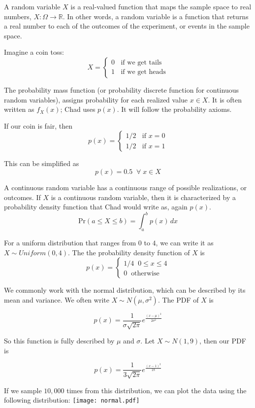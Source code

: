 \documentclass{article} %
\newcommand*\red{\color{red}}  %
\begin{document}
A {\red random variable} $X$ is a real-valued function that maps the sample space to real numbers, $X : \Omega \rightarrow \mathbb{R}$. In other words, a random variable is a function that returns a real number to each of the outcomes of the experiment, or events in the sample space.

Imagine a coin toss:
\[
X = \begin{cases}
	0 \;\; \text{ if we get tails} \\
	1 \;\; \text{ if we get heads}
\end{cases}
\]

The {\red probability mass function} (or probability discrete function for continuous random variables), assigns probability for each realized value $x \in X$. It is often written as $f_X(x)$; Chad uses $p(x)$. It will follow the probability axioms.

If our coin is fair, then
\[
p(x) = \begin{cases}
1/2 \;\; \text{ if } x = 0 \\
1/2 \;\; \text{ if } x = 1
\end{cases}
\]

This can be simplified as 
\[
p(x) = 0.5 \;\; \forall \; x \in X
\]

A {\red continuous random variable} has a continuous range of possible realizations, or outcomes. If $X$ is a continuous random variable, then it is characterized by a {\red probability density function} that Chad would write as, again $p(x)$.
\[
\text{Pr}(a \leq X \leq b) =  \int_a^b p(x) \, dx
\] 

For a uniform distribution that ranges from $0$ to $4$, we can write it as $X \sim Uniform(0, 4)$. The the probability density function of $X$ is
\[
p(x) = \begin{cases}
1/4 \;\; 0 \leq x \leq 4 \\
0 \;\; \text{otherwise}
\end{cases}
\] 

We commonly work with the normal distribution, which can be described by its mean and variance. We often write $X \sim N(\mu, \sigma^2)$. The PDF of $X$ is

\[
p(x) = \frac{1}{\sigma \sqrt{2\pi}} e^{\frac{(x - \mu)^2}{2\sigma^2}}
\]

So this function is fully described by $\mu$ and $\sigma$. Let $X \sim N(1, 9)$, then our PDF is

\[
p(x) = \frac{1}{3\sqrt{2\pi}} e^{\frac{(x - 1)^2}{18}}
\]

If we sample $10,000$ times from this distribution, we can plot the data using the following distribution:
\texttt{[image: normal.pdf]}
\end{document}
